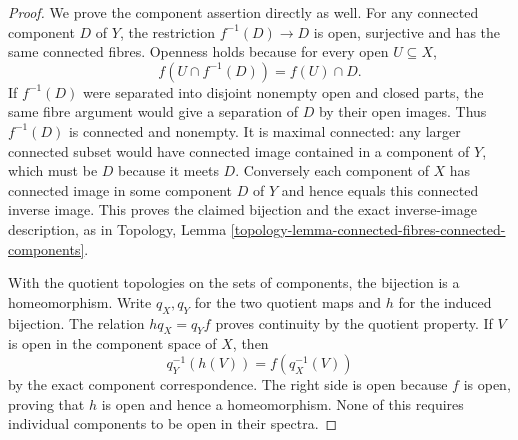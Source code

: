 \begin{proof}
We prove the component assertion
directly as well. For any
connected component $D$ of
$Y$, the restriction
$f^{-1}(D)\to D$ is open,
surjective and has the same
connected fibres. Openness
holds because for every open
$U\subseteq X$,
$$
f(U\cap f^{-1}(D))=f(U)\cap D.
$$
If $f^{-1}(D)$ were separated
into disjoint nonempty open
and closed parts, the same
fibre argument would give
a separation of $D$ by
their open images. Thus
$f^{-1}(D)$ is connected
and nonempty. It is maximal
connected: any larger connected
subset would have connected
image contained in a component
of $Y$, which must be $D$
because it meets $D$.
Conversely each component
of $X$ has connected image
in some component $D$ of
$Y$ and hence equals this
connected inverse image.
This proves the claimed
bijection and the exact
inverse-image description,
as in Topology, Lemma
\ref{topology-lemma-connected-fibres-connected-components}.

With the quotient topologies
on the sets of components,
the bijection is a homeomorphism.
Write $q_X,q_Y$ for the two
quotient maps and $h$ for
the induced bijection.
The relation $h q_X=q_Y f$
proves continuity by the
quotient property. If $V$
is open in the component
space of $X$, then
$$
q_Y^{-1}(h(V))=f(q_X^{-1}(V))
$$
by the exact component
correspondence. The right
side is open because $f$
is open, proving that $h$
is open and hence a
homeomorphism. None of this
requires individual components
to be open in their spectra.
\end{proof}
